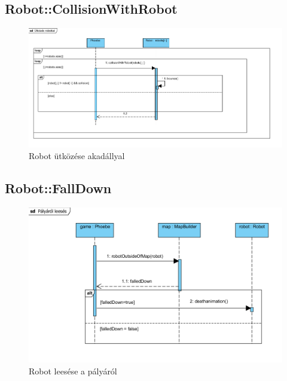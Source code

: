 \subsection{Robot::CollisionWithRobot}
\begin{figure}[h]
\begin{center}
\includegraphics[width=17cm]{images/collisionWithRobot()_sequence.PNG}
\caption{Robot ütközése akadállyal}
\label{fig:example5}
\end{center}
\end{figure}
\pagebreak

\subsection{Robot::FallDown}
\begin{figure}[h]
\begin{center}
\includegraphics[width=17cm]{images/FallingDown.PNG}
\caption{Robot leesése a pályáról}
\label{fig:example6}
\end{center}
\end{figure}
\pagebreak

